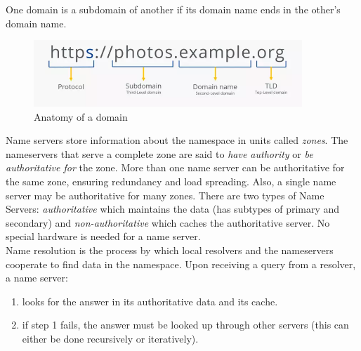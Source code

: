 One domain is a subdomain of another if its domain name ends in the other's domain name. 

\begin{figure}[H]
    \centering
    \includegraphics[width=0.9\textwidth]{assets/domain-anatomy.png}    
    \caption{Anatomy of a domain}
\end{figure}

Name servers store information about the namespace in units called \textit{zones}. The nameservers that serve a complete zone are said to \textit{have authority} or \textit{be authoritative for} the zone. More than one name server can be authoritative for the same zone, ensuring redundancy and load spreading. Also, a single name server may be authoritative for many zones. There are two types of Name Servers: \textit{authoritative} which maintains the data (has subtypes of primary and secondary) and \textit{non-authoritative} which caches the authoritative server. No special hardware is needed for a name server.\\

Name resolution is the process by which local resolvers and the nameservers cooperate to find data in the namespace. Upon receiving a query from a resolver, a name server:
\begin{enumerate}
    \item looks for the answer in its authoritative data and its cache.
    \item if step 1 fails, the answer must be looked up through other servers (this can either be done recursively or iteratively).
\end{enumerate}